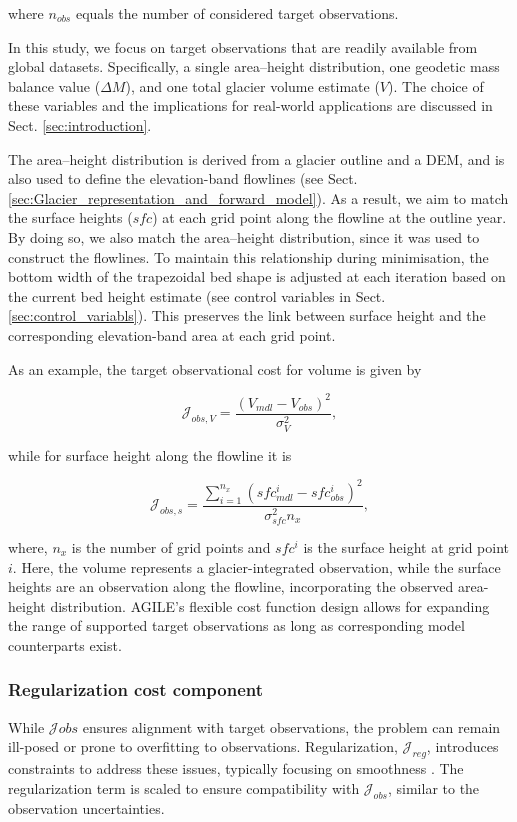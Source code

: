 \documentclass[journal abbreviation, manuscript]{copernicus}
\begin{document}
\noindent where $n_{obs}$ equals the number of considered target observations.

In this study, we focus on target observations that are readily available from global datasets. Specifically, a single area–height distribution, one geodetic mass balance value ($\Delta M$), and one total glacier volume estimate ($V$). The choice of these variables and the implications for real-world applications are discussed in Sect. \ref{sec:introduction}.

The area–height distribution is derived from a glacier outline and a DEM, and is also used to define the elevation-band flowlines (see Sect. \ref{sec:Glacier_representation_and_forward_model}). As a result, we aim to match the surface heights ($sfc$) at each grid point along the flowline at the outline year. By doing so, we also match the area–height distribution, since it was used to construct the flowlines. To maintain this relationship during minimisation, the bottom width of the trapezoidal bed shape is adjusted at each iteration based on the current bed height estimate (see control variables in Sect. \ref{sec:control_variabls}). This preserves the link between surface height and the corresponding elevation-band area at each grid point.

As an example, the target observational cost for volume is given by

\begin{equation}
    \mathcal{J}_{obs,V} = \frac{(V_{mdl} - V_{obs})^2}{\sigma^2_{V}},
\end{equation}

\noindent while for surface height along the flowline it is

\begin{equation}
    \mathcal{J}_{obs,s} = \frac{\sum_{i=1}^{n_x} (sfc^i_{mdl} - sfc^i_{obs})^2}{\sigma^2_{sfc}n_x},
\end{equation}

\noindent where, $n_x$ is the number of grid points and $sfc^i$ is the surface height at grid point $i$. Here, the volume represents a glacier-integrated observation, while the surface heights are an observation along the flowline, incorporating the observed area-height distribution. AGILE's flexible cost function design allows for expanding the range of supported target observations as long as corresponding model counterparts exist.

\subsubsection{Regularization cost component}
\label{subsec:cost_reg}
While $\mathcal{J}{obs}$ ensures alignment with target observations, the problem can remain ill-posed or prone to overfitting to observations. Regularization, $\mathcal{J}_{reg}$, introduces constraints to address these issues, typically focusing on smoothness \citep[e.g.][]{Goldberg2013, Fuerst2017, Jouvet2022}. The regularization term is scaled to ensure compatibility with $\mathcal{J}_{obs}$, similar to the observation uncertainties.
\end{document}
